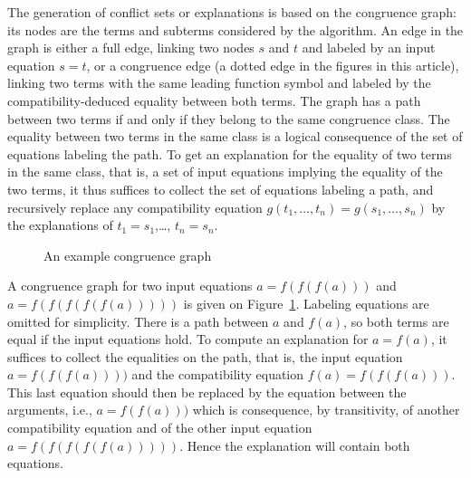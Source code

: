 \documentclass[smallextended]{svjour3}
\begin{document}
The generation of conflict sets or explanations is based on the congruence
graph: its nodes are the terms and subterms considered by the algorithm.  An
edge in the graph is either a full edge, linking two nodes $s$ and $t$ and
labeled by an input equation $s=t$, or a congruence edge (a dotted edge in the
figures in this article), linking two terms with the same leading function symbol
and labeled by the compatibility-deduced equality between both terms.  The graph
has a path between two terms if and only if they belong to the same congruence
class.  The equality between two terms in the same class is a logical consequence
of the set of equations labeling the path.  To get an explanation for the
equality of two terms in the same class, that is, a set of input equations
implying the equality of the two terms, it thus suffices to collect the set of
equations labeling a path, and recursively replace any compatibility equation
$g(t_1,\ldots,t_n) = g(s_1,\ldots,s_n)$ by the explanations of $t_1=s_1$,\dots,
$t_n=s_n$.

\begin{figure}[ht]

\caption{An example congruence graph}
\label{fig:congruenceexample}
\end{figure}

\begin{example}
A congruence graph for two input equations $a = f(f(f(a)))$ and $a =
f(f(f(f(f(a)))))$ is given on Figure~\ref{fig:congruenceexample}.  Labeling
equations are omitted for simplicity.  There is a path between $a$ and $f(a)$,
so both terms are equal if the input equations hold.  To compute an explanation
for $a=f(a)$, it suffices to collect the equalities on the path, that is, the
input equation $a=f(f(f(a))))$ and the compatibility equation $f(a)=f(f(f(a)))$.
This last equation should then be replaced by the equation between the
arguments, i.e., $a=f(f(a)))$ which is consequence, by transitivity, of another
compatibility equation and of the other input equation $a = f(f(f(f(f(a)))))$.
Hence the explanation will contain both equations.
\end{example}
\end{document}
